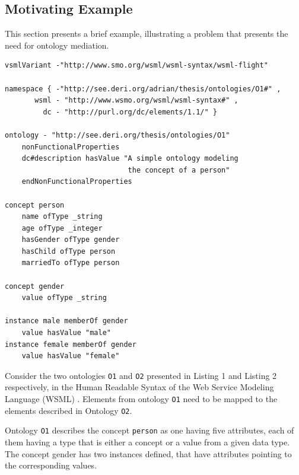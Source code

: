 \subsection{Motivating Example}
\label{subsec:mediationproblem_motivatingexample}
This section presents a brief example, illustrating a problem that
presents the need for ontology mediation. 

\lstset{emphstyle=\textbf\textit\underbar}
\begin{lstlisting}
vsmlVariant -"http://www.smo.org/wsml/wsml-syntax/wsml-flight"

namespace { -"http://see.deri.org/adrian/thesis/ontologies/O1#" ,
       wsml - "http://www.wsmo.org/wsml/wsml-syntax#" ,
         dc - "http://purl.org/dc/elements/1.1/" }

ontology - "http://see.deri.org/thesis/ontologies/O1"
    nonFunctionalProperties
    dc#description hasValue "A simple ontology modeling
                             the concept of a person"
    endNonFunctionalProperties

concept person
    name ofType _string
    age ofType _integer
    hasGender ofType gender
    hasChild ofType person
    marriedTo ofType person

concept gender
    value ofType _string

instance male memberOf gender
    value hasValue "male"
instance female memberOf gender
    value hasValue "female"
\end{lstlisting}

Consider the two ontologies \texttt{O1} and
\texttt{O2} \cite{mocan2008mediation} presented in Listing 1 and
Listing 2 respectively, in the Human Readable Syntax of the Web Service
Modeling Language (WSML) \cite{debruin2005wsml}. Elements from
ontology \texttt{O1} need to be mapped to the elements
described in Ontology \texttt{O2}. 

Ontology \texttt{O1} describes the concept
\texttt{person} as one having five attributes, each of
them having a type that is either a concept or a value from a given
data type. The concept gender has two instances defined, that have
attributes pointing to the corresponding values. 

